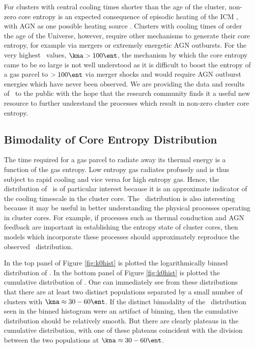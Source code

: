 \documentclass[apj]{emulateapj}
\begin{document}
For clusters with central cooling times shorter than the age of the
cluster, non-zero core entropy is an expected consequence of episodic
heating of the ICM \citep{agnframework}, with AGN as one possible
heating source \citep{1997MNRAS.288..355B, 2000ApJ...532...17L,
2001Natur.414..425V, 2002MNRAS.332..729C, 2002Natur.418..301B,
2002MNRAS.331..545B, 2002MNRAS.333..145N, 2002ApJ...581..223R,
2002MNRAS.335..610A, 2004MNRAS.348.1105O, 2004ApJ...613..811M,
2004ApJ...615..681R, 2004ApJ...617..896H, 2004MNRAS.355..995D,
2005ApJ...622..847S, pizzolato05, 2006ApJ...643..120B,
2006ApJ...638..659M}. Clusters with cooling times of order the age of
the Universe, however, require other mechanisms to generate their core
entropy, for example via mergers or extremely energetic AGN
outbursts. For the very highest \kna\ values, $\kna > 100 \ent$, the
mechanism by which the core entropy came to be so large is not well
understood as it is difficult to boost the entropy of a gas parcel to
$> 100 \ent$ via merger shocks \citep{2008MNRAS.386.1309M} and would
require AGN outburst energies which have never been observed. We are
providing the data and results of \accept\ to the public with the hope
that the research community finds it a useful new resource to further
understand the processes which result in non-zero cluster core
entropy.

\subsection{Bimodality of Core Entropy Distribution}
\label{sec:bimod}

The time required for a gas parcel to radiate away its thermal energy
is a function of the gas entropy. Low entropy gas radiates profusely
and is thus subject to rapid cooling and vice versa for high entropy
gas. Hence, the distribution of \kna\ is of particular interest
because it is an approximate indicator of the cooling timescale in the
cluster core. The \kna\ distribution is also interesting because it
may be useful in better understanding the physical processes operating
in cluster cores. For example, if processes such as thermal conduction
and AGN feedback are important in establishing the entropy state of
cluster cores, then models which incorporate these processes should
approximately reproduce the observed \kna\ distribution.

In the top panel of Figure \ref{fig:k0hist} is plotted the
logarithmically binned distribution of \kna. In the bottom panel of
Figure \ref{fig:k0hist} is plotted the cumulative distribution of
\kna. One can immediately see from these distributions that there are
at least two distinct populations separated by a small number of
clusters with $\kna \approx 30-60 \ent$. If the distinct bimodality of
the \kna\ distribution seen in the binned histogram were an artifact
of binning, then the cumulative distribution should be relatively
smooth. But there are clearly plateaus in the cumulative distribution,
with one of these plateaus coincident with the division between the
two populations at $\kna \approx 30-60 \ent$.
\end{document}
